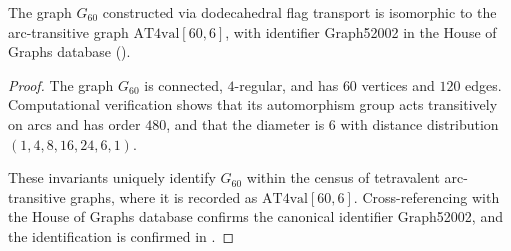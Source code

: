 \begin{proposition}
The graph $G_{60}$ constructed via dodecahedral flag transport is
isomorphic to the arc-transitive graph $\mathrm{AT4val}[60,6]$,
with identifier Graph52002 in the House of Graphs database
(\cite{potocnik_graphsym,house_of_graphs,potocnik_private}).
\end{proposition}

\begin{proof}
The graph $G_{60}$ is connected, $4$-regular, and has $60$ vertices and
$120$ edges. Computational verification shows that its automorphism group
acts transitively on arcs and has order $480$, and that the diameter is $6$
with distance distribution $(1,4,8,16,24,6,1)$.

These invariants uniquely identify $G_{60}$ within the census of tetravalent
arc-transitive graphs, where it is recorded as $\mathrm{AT4val}[60,6]$.
Cross-referencing with the House of Graphs database confirms the canonical
identifier Graph52002, and the identification is confirmed in
\cite{potocnik_private}.
\end{proof}
